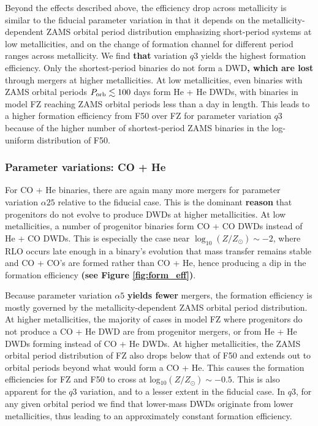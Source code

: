 \documentclass[twocolumn]{aastex631}
\begin{document}
Beyond the effects described above, the efficiency drop across metallicity is similar to the fiducial parameter variation in that it depends on the metallicity-dependent ZAMS orbital period distribution emphasizing short-period systems at low metallicities, and on the change of formation channel for different period ranges across metallicity. We find \textbf{that} variation $q3$ yields the highest formation efficiency. Only the shortest-period binaries do not form a DWD\textbf{, which are lost} through mergers at higher metallicities. At low metallicities, even binaries with ZAMS orbital periods $P_{\rm{orb}}\lesssim 100$ days form He + He DWDs, with binaries in model FZ reaching ZAMS orbital periods less than a day in length. This leads to a higher formation efficiency from F50 over FZ for parameter variation $q3$ because of the higher number of shortest-period ZAMS binaries in the log-uniform distribution of F50.

\subsubsection{\textbf{Parameter variations: CO + He}}\label{formeff_COHe_vars}
For CO + He binaries, there are again many more mergers for parameter variation $\alpha25$ relative to the fiducial case. This is the dominant \textbf{reason} that progenitors do not evolve to produce DWDs at higher metallicities. At low metallicities, a number of progenitor binaries form CO + CO DWDs instead of He + CO DWDs. This is especially the case near $\log_{10}(Z/Z_\odot)\sim -2$, where RLO occurs late enough in a binary's evolution that mass transfer remains stable and CO + CO's are formed rather than CO + He, hence producing a dip in the formation efficiency \textbf{(see Figure \ref{fig:form_eff})}.


Because parameter variation $\alpha5$ \textbf{yields fewer} mergers, the formation efficiency is mostly governed by the metallicity-dependent ZAMS orbital period distribution. At higher metallicities, the majority of cases in model FZ where progenitors do not produce a CO + He DWD are from progenitor mergers, or from He + He DWDs forming instead of CO + He DWDs. At higher metallicities, the ZAMS orbital period distribution of FZ also drops below that of F50 and extends out to orbital periods beyond what would form a CO + He. This causes the formation efficiencies for FZ and F50 to cross at log$_{10}(Z/Z_\odot)\sim-0.5$. This is also apparent for the $q3$ variation, and to a lesser extent in the fiducial case. In $q3$, for any given orbital period we find that lower-mass DWDs originate from lower metallicities, thus leading to an approximately constant formation efficiency.
\end{document}
